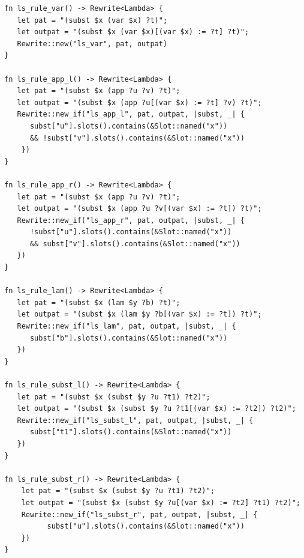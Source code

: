 \begin{listing*}
	\centering
	\begin{minipage}{0.8\textwidth}
		\begin{verbatim}
fn ls_rule_var() -> Rewrite<Lambda> {
   let pat = "(subst $x (var $x) ?t)";
   let outpat = "(subst $x (var $x)[(var $x) := ?t] ?t)";
   Rewrite::new("ls_var", pat, outpat)
}

fn ls_rule_app_l() -> Rewrite<Lambda> {
   let pat = "(subst $x (app ?u ?v) ?t)";
   let outpat = "(subst $x (app ?u[(var $x) := ?t] ?v) ?t)";
   Rewrite::new_if("ls_app_l", pat, outpat, |subst, _| {
      subst["u"].slots().contains(&Slot::named("x")) 
	  && !subst["v"].slots().contains(&Slot::named("x"))
    })
}

fn ls_rule_app_r() -> Rewrite<Lambda> {
   let pat = "(subst $x (app ?u ?v) ?t)";
   let outpat = "(subst $x (app ?u ?v[(var $x) := ?t]) ?t)";
   Rewrite::new_if("ls_app_r", pat, outpat, |subst, _| {
      !subst["u"].slots().contains(&Slot::named("x")) 
	  && subst["v"].slots().contains(&Slot::named("x"))
   })
}

fn ls_rule_lam() -> Rewrite<Lambda> {
   let pat = "(subst $x (lam $y ?b) ?t)";
   let outpat = "(subst $x (lam $y ?b[(var $x) := ?t]) ?t)";
   Rewrite::new_if("ls_lam", pat, outpat, |subst, _| {
      subst["b"].slots().contains(&Slot::named("x"))
   })
}

fn ls_rule_subst_l() -> Rewrite<Lambda> {
   let pat = "(subst $x (subst $y ?u ?t1) ?t2)";
   let outpat = "(subst $x (subst $y ?u ?t1[(var $x) := ?t2]) ?t2)";
   Rewrite::new_if("ls_subst_l", pat, outpat, |subst, _| {
      subst["t1"].slots().contains(&Slot::named("x"))
   })
}

fn ls_rule_subst_r() -> Rewrite<Lambda> {
    let pat = "(subst $x (subst $y ?u ?t1) ?t2)";
    let outpat = "(subst $x (subst $y ?u[(var $x) := ?t2] ?t1) ?t2)";
    Rewrite::new_if("ls_subst_r", pat, outpat, |subst, _| {
          subst["u"].slots().contains(&Slot::named("x"))
    })
}
	\end{verbatim}
	\end{minipage}
	\caption{$\lambda_{\text{lsub}}$ $ls$-rules}
	\label{listing:lsub_ls_rules}
\end{listing*}

\clearpage

